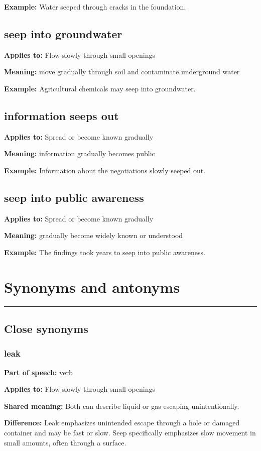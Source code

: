 \documentclass[11pt]{article}
\newcommand{\sectionrule}{\par\vspace{-0.5em}\noindent\textcolor{Accent}{\rule{\linewidth}{0.6pt}}\par}
\begin{document}
\textbf{Example:} Water seeped through cracks in the foundation.

\subsection{seep into groundwater}
\textbf{Applies to:} Flow slowly through small openings

\textbf{Meaning:} move gradually through soil and contaminate underground water

\textbf{Example:} Agricultural chemicals may seep into groundwater.

\subsection{information seeps out}
\textbf{Applies to:} Spread or become known gradually

\textbf{Meaning:} information gradually becomes public

\textbf{Example:} Information about the negotiations slowly seeped out.

\subsection{seep into public awareness}
\textbf{Applies to:} Spread or become known gradually

\textbf{Meaning:} gradually become widely known or understood

\textbf{Example:} The findings took years to seep into public awareness.

\section{Synonyms and antonyms}
\sectionrule
\subsection{Close synonyms}
\subsubsection{leak}
\textbf{Part of speech:} verb

\textbf{Applies to:} Flow slowly through small openings

\textbf{Shared meaning:} Both can describe liquid or gas escaping unintentionally.

\textbf{Difference:} Leak emphasizes unintended escape through a hole or damaged container and may be fast or slow. Seep specifically emphasizes slow movement in small amounts, often through a surface.
\end{document}
